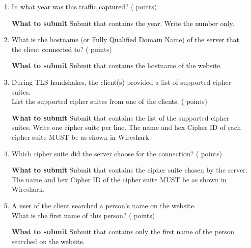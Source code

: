\begin{enumerate}
  \item \hypertarget{cp1year}{In what year was this traffic captured? ( points)} \label{itm:year}

    \textbf{What to submit}\hspace{10pt}
    Submit \texttt{\hyperlink{yearformat}{\fileyear}} that contains the year. Write the number only.

  \item \hypertarget{cp1domain}{What is the hostname (or Fully Qualified Domain Name) of the server that the client connected to? ( points)} \label{itm:domain}

    \textbf{What to submit}\hspace{10pt}
    Submit \texttt{\hyperlink{domainformat}{\filedomain}} that contains the hostname of the website.

  \item \hypertarget{cp1cslist}{During TLS handshakes, the client(s) provided a list of supported cipher suites.\\
  List the supported cipher suites from one of the clients. ( points)} \label{itm:cslist}

    \textbf{What to submit}\hspace{10pt}
    Submit \texttt{\hyperlink{cslistformat}{\filecslist}} that contains the list of the supported cipher suites.
    Write one cipher suite per line.
    The name and hex Cipher ID of each cipher suite MUST be as shown in Wireshark.

  \item \hypertarget{cp1servercs}{Which cipher suite did the server choose for the connection? ( points)} \label{itm:servercs}

    \textbf{What to submit}\hspace{10pt}
    Submit \texttt{\hyperlink{servercsformat}{\fileservercs}} that contains the cipher suite chosen by the server.
    The name and hex Cipher ID of the cipher suite MUST be as shown in Wireshark.

  \item \hypertarget{cp1name}{A user of the client searched a person's name on the website.\\
  What is the first name of this person? ( points)} \label{itm:name}

    \textbf{What to submit}\hspace{10pt}
    Submit \texttt{\hyperlink{nameformat}{\filename}} that contains only the first name of the person searched on the website.


\end{enumerate}
